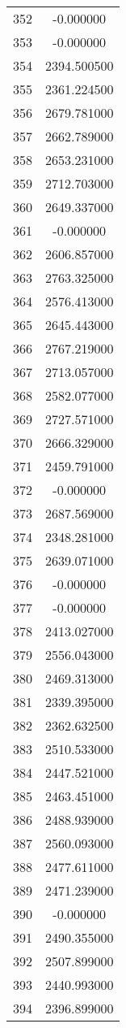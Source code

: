 \documentclass[12pt]{article}
\begin{document}
\begin{longtable}{@{}cc@{}}
352 & -0.000000 \\
353 & -0.000000 \\
354 & 2394.500500 \\
355 & 2361.224500 \\
356 & 2679.781000 \\
357 & 2662.789000 \\
358 & 2653.231000 \\
359 & 2712.703000 \\
360 & 2649.337000 \\
361 & -0.000000 \\
362 & 2606.857000 \\
363 & 2763.325000 \\
364 & 2576.413000 \\
365 & 2645.443000 \\
366 & 2767.219000 \\
367 & 2713.057000 \\
368 & 2582.077000 \\
369 & 2727.571000 \\
370 & 2666.329000 \\
371 & 2459.791000 \\
372 & -0.000000 \\
373 & 2687.569000 \\
374 & 2348.281000 \\
375 & 2639.071000 \\
376 & -0.000000 \\
377 & -0.000000 \\
378 & 2413.027000 \\
379 & 2556.043000 \\
380 & 2469.313000 \\
381 & 2339.395000 \\
382 & 2362.632500 \\
383 & 2510.533000 \\
384 & 2447.521000 \\
385 & 2463.451000 \\
386 & 2488.939000 \\
387 & 2560.093000 \\
388 & 2477.611000 \\
389 & 2471.239000 \\
390 & -0.000000 \\
391 & 2490.355000 \\
392 & 2507.899000 \\
393 & 2440.993000 \\
394 & 2396.899000 \\

\end{longtable}
\end{document}
